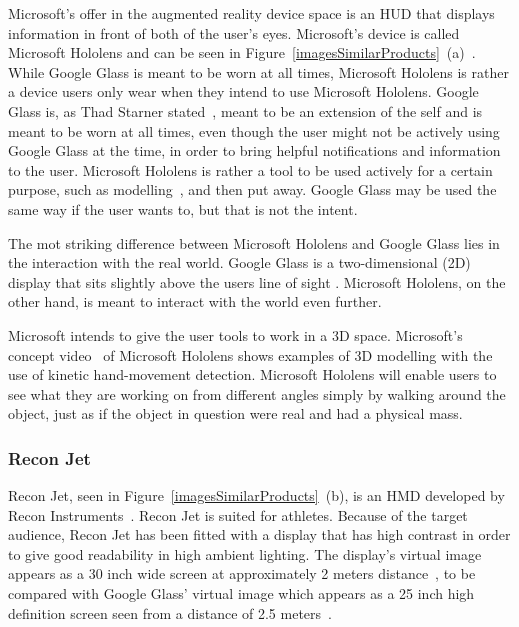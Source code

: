 Microsoft's offer in the augmented reality device space is an HUD that displays information in front of both of the user's eyes. Microsoft's device is called Microsoft Hololens and can be seen in Figure~\ref{imagesSimilarProducts}~(a)~\cite{hololens}. 
While Google Glass is meant to be worn at all times, Microsoft Hololens is rather a device users only wear when they intend to use Microsoft Hololens. Google Glass is, as Thad Starner stated~\cite{6504855}, meant to be an extension of the self and is meant to be worn at all times, even though the user might not be actively using Google Glass at the time, in order to bring helpful notifications and information to the user. Microsoft Hololens is rather a tool to be used actively for a certain purpose, such as modelling~\cite{hololensDemo}, and then put away. Google Glass may be used the same way if the user wants to, but that is not the intent.

The mot striking difference between Microsoft Hololens and Google Glass lies in the interaction with the real world. Google Glass is a two-dimensional (2D) display that sits slightly above the users line of sight%
. Microsoft Hololens, on the other hand, is meant to interact with the world even further.

Microsoft intends to give the user tools to work in a 3D space. Microsoft's concept video~\cite{hololensConceptVideo} of Microsoft Hololens shows examples of 3D modelling with the use of kinetic hand-movement detection. Microsoft Hololens will enable users to see what they are working on from different angles simply by walking around the object, just as if the object in question were real and had a physical mass.

\subsubsection{Recon Jet}

Recon Jet, seen in Figure~\ref{imagesSimilarProducts}~(b), is an HMD developed by Recon Instruments~\cite{reconJet}. Recon Jet is suited for athletes. Because of the target audience, Recon Jet has been fitted with a display that has high contrast in order to give good readability in high ambient lighting. The display's virtual image appears as  a 30 inch wide screen at approximately 2 meters distance~\cite{reconJetSpecs}, to be compared with Google Glass' virtual image which appears as a 25 inch high definition screen seen from a distance of 2.5 meters~\cite{GlassSpecs}.

